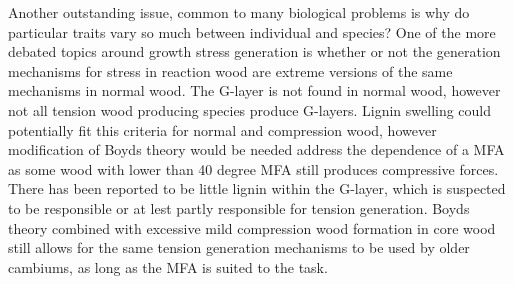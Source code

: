 Another outstanding issue, common to many biological problems is why do
particular traits vary so much between individual and species? One of the
more debated topics around growth stress generation is whether or not the generation
mechanisms for stress in reaction wood are extreme versions of the same
mechanisms in normal wood. The G-layer is not found in normal wood, however not
all tension wood producing species produce G-layers. Lignin swelling could
potentially fit this criteria for normal and compression wood, however
modification of Boyds theory would be needed address the dependence of a MFA
as some wood with lower than 40 degree MFA still produces compressive forces.
There has been reported to be little lignin within the G-layer, which is
suspected to be responsible or at lest partly responsible for tension
generation. Boyds theory combined with excessive mild compression wood
formation in core wood still allows for the same tension generation mechanisms
to be used by older cambiums, as long as the MFA is suited to the task.